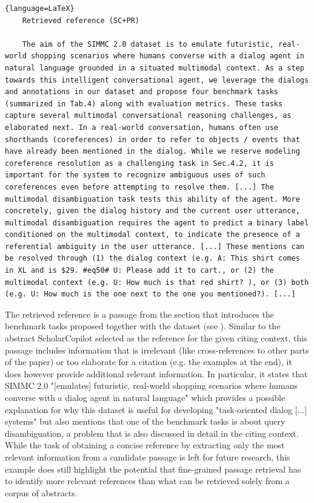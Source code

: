 \begin{lstlisting}{language=LaTeX}
    Retrieved reference (SC+PR)
    
    The aim of the SIMMC 2.0 dataset is to emulate futuristic, real-world shopping scenarios where humans converse with a dialog agent in natural language grounded in a situated multimodal context. As a step towards this intelligent conversational agent, we leverage the dialogs and annotations in our dataset and propose four benchmark tasks (summarized in Tab.4) along with evaluation metrics. These tasks capture several multimodal conversational reasoning challenges, as elaborated next. In a real-world conversation, humans often use shorthands (coreferences) in order to refer to objects / events that have already been mentioned in the dialog. While we reserve modeling coreference resolution as a challenging task in Sec.4.2, it is important for the system to recognize ambiguous uses of such coreferences even before attempting to resolve them. [...] The multimodal disambiguation task tests this ability of the agent. More concretely, given the dialog history and the current user utterance, multimodal disambiguation requires the agent to predict a binary label conditioned on the multimodal context, to indicate the presence of a referential ambiguity in the user utterance. [...] These mentions can be resolved through (1) the dialog context (e.g. A: This shirt comes in XL and is $29. #eq50# U: Please add it to cart., or (2) the multimodal context (e.g. U: How much is that red shirt? ), or (3) both (e.g. U: How much is the one next to the one you mentioned?). [...]
\end{lstlisting}
The retrieved reference is a passage from the section that introduces the benchmark tasks proposed together with the dataset (see \cite[4]{kottur2021simmc}). Similar to the abstract ScholarCopilot selected as the reference for the given citing context, this passage includes information that is irrelevant (like cross-references to other parts of the paper) or too elaborate for a citation (e.g. the examples at the end), it does however provide additional relevant information. In particular, it states that SIMMC 2.0 "[emulates] futuristic, real-world shopping scenarios where humans converse with a dialog agent in natural language" which provides a possible explanation for why this dataset is useful for developing "task-oriented dialog [...] systems" but also mentions that one of the benchmark tasks is about query disambiguation, a problem that is also discussed in detail in the citing context. While the task of obtaining a concise reference by extracting only the most relevant information from a candidate passage is left for future research, this example does still highlight the potential that fine-grained passage retrieval has to identify more relevant references than what can be retrieved solely from a corpus of abstracts.

